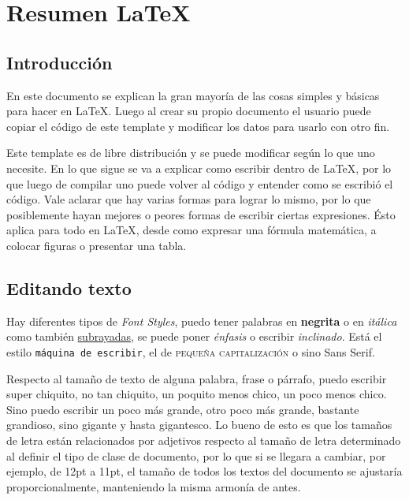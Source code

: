 \documentclass[a4paper,12pt]{article} %
\begin{document}
\thispagestyle{empty} %
\newpage              %
\tableofcontents      %
\thispagestyle{empty} %
\newpage              %

\clearpage

\section{Resumen \LaTeX}
\subsection{Introducción}
	
	En este documento se explican la gran mayoría de las cosas simples y básicas para hacer en \LaTeX. Luego al crear su propio documento el usuario puede copiar el código de este template y modificar los datos para usarlo con otro fin. 
	
	Este template es de libre distribución y se puede modificar según lo que uno necesite. En lo que sigue se va a explicar como escribir dentro de \LaTeX, por lo que luego de compilar uno puede volver al código y entender como se escribió el código. Vale aclarar que hay varias formas para lograr lo mismo, por lo que posiblemente hayan mejores o peores formas de escribir ciertas expresiones. Ésto aplica para todo en \LaTeX, desde como expresar una fórmula matemática, a colocar figuras o presentar una tabla.

\subsection{Editando texto}
	Hay diferentes tipos de \textit{Font Styles}, puedo tener palabras en \textbf{negrita} o en \textit{itálica} como también \underline{subrayadas}, se puede poner \emph{énfasis} o escribir \textsl{inclinado}. Está el estilo \texttt{máquina de escribir}, el de \textsc{pequeña capitalización} o sino \textsf{Sans Serif}.
	
	Respecto al tamaño de texto de alguna palabra, frase o párrafo, puedo escribir {\tiny super chiquito}, no tan {\scriptsize chiquito}, un poquito menos {\footnotesize chico}, un poco menos {\small chico}. Sino puedo escribir un poco más {\large grande}, otro poco más {\Large grande}, bastante {\LARGE grandioso}, sino {\huge gigante } y hasta {\Huge gigantesco}. Lo bueno de esto es que los tamaños de letra están relacionados por adjetivos respecto al tamaño de letra determinado al definir el tipo de clase de documento, por lo que si se llegara a cambiar, por ejemplo, de 12pt a 11pt, el tamaño de todos los textos del documento se ajustaría proporcionalmente, manteniendo la misma armonía de antes.
	
\end{document}
